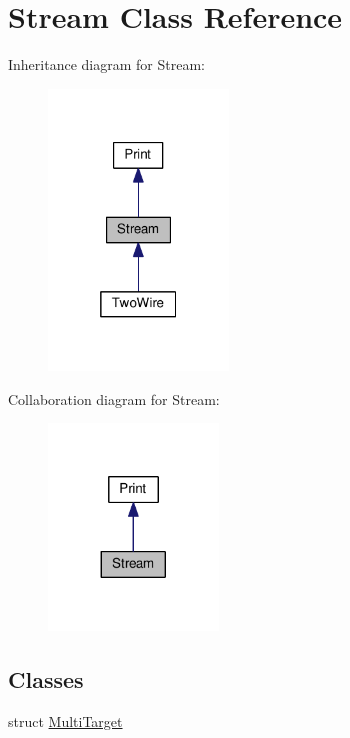 \hypertarget{class_stream}{}\section{Stream Class Reference}
\label{class_stream}


Inheritance diagram for Stream\+:
\nopagebreak
\begin{figure}[H]
\begin{center}
\leavevmode
\includegraphics[width=136pt]{class_stream__inherit__graph}
\end{center}
\end{figure}


Collaboration diagram for Stream\+:
\nopagebreak
\begin{figure}[H]
\begin{center}
\leavevmode
\includegraphics[width=128pt]{class_stream__coll__graph}
\end{center}
\end{figure}
\subsection*{Classes}
\begin{DoxyCompactItemize}
\item 
struct \hyperlink{struct_stream_1_1_multi_target}{Multi\+Target}
\end{DoxyCompactItemize}
